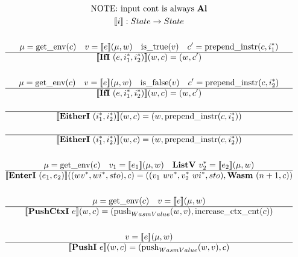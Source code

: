
\newpage

\begin{gather*}
  \text{NOTE: input cont is always \al} \\
  \sem{i} : State \rightarrow State \\
%
\newline \\
  \mu = \getenv(c) \quad v = \sem{e}(\mu, w) \quad
  \istrue(v) \quad c' = \prependinstr(c, \seq{i_1}) \\
  \hline
  \sem{\ifi ~ (e, \seq{i_1}, \seq{i_2})}(w, c) = (w, c') \\
%
\newline \\
  \mu = \getenv(c) \quad v = \sem{e}(\mu, w) \quad
  \isfalse(v) \quad c' = \prependinstr(c, \seq{i_2}) \\
  \hline
  \sem{\ifi ~ (e, \seq{i_1}, \seq{i_2})}(w, c) = (w, c') \\
%
\newline \\
  \hline
  \sem{\eitheri ~ (\seq{i_1}, \seq{i_2})}(w, c) = (w, \prependinstr(c, \seq{i_1})) \\
%
\newline \\
  \hline
  \sem{\eitheri ~ (\seq{i_1}, \seq{i_2})}(w, c) = (w, \prependinstr(c, \seq{i_2})) \\
%
\newline \\
  \mu = \getenv(c) \quad v_1 = \sem{e_1}(\mu, w) \quad \listv ~ \seq{v_2} = \sem{e_2}(\mu, w) \\
  \hline
  \sem{\enteri ~ (e_1, e_2)}((\seq{wv}, \seq{wi}, sto), c)
  =
  ((v_1 ~ \seq{wv}, \seq{v_2} ~ \seq{wi}, sto), \wasm ~ (n+1, c)) \\
%
\newline \\
  \mu = \getenv(c) \quad v = \sem{e}(\mu, w) \\
  \hline
  \sem{\pushctxi ~ e}(w, c)
  =
  (\push_{WasmValue}(w, v), \increasectxcnt(c)) \\
%
\newline \\
  v = \sem{e}(\mu, w) \\
  \hline
  \sem{\pushi ~ e}(w, c) = (\push_{WasmValue}(w, v), c) \\
%
\newline \\

\end{gather*}
